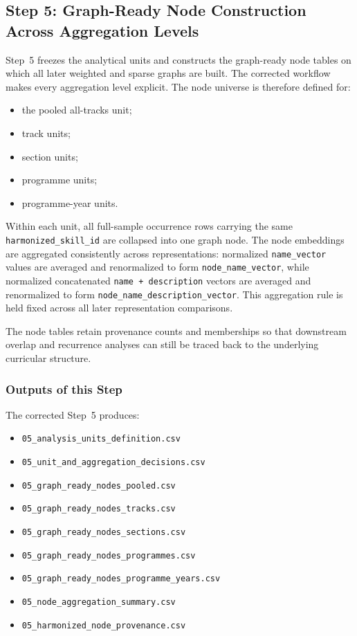 \subsection{Step 5: Graph-Ready Node Construction Across Aggregation Levels}
\label{sec:step5_graph_ready_nodes}

Step~5 freezes the analytical units and constructs the graph-ready node tables on which all later weighted and sparse graphs are built. The corrected workflow makes every aggregation level explicit. The node universe is therefore defined for:
\begin{itemize}
    \item the pooled all-tracks unit;
    \item track units;
    \item section units;
    \item programme units;
    \item programme-year units.
\end{itemize}

Within each unit, all full-sample occurrence rows carrying the same \texttt{harmonized\_skill\_id} are collapsed into one graph node. The node embeddings are aggregated consistently across representations: normalized \texttt{name\_vector} values are averaged and renormalized to form \texttt{node\_name\_vector}, while normalized concatenated \texttt{name + description} vectors are averaged and renormalized to form \texttt{node\_name\_description\_vector}. This aggregation rule is held fixed across all later representation comparisons.

The node tables retain provenance counts and memberships so that downstream overlap and recurrence analyses can still be traced back to the underlying curricular structure.

\subsubsection{Outputs of this Step}
\label{sec:step5_outputs}

The corrected Step~5 produces:
\begin{itemize}
    \item \texttt{05\_analysis\_units\_definition.csv}
    \item \texttt{05\_unit\_and\_aggregation\_decisions.csv}
    \item \texttt{05\_graph\_ready\_nodes\_pooled.csv}
    \item \texttt{05\_graph\_ready\_nodes\_tracks.csv}
    \item \texttt{05\_graph\_ready\_nodes\_sections.csv}
    \item \texttt{05\_graph\_ready\_nodes\_programmes.csv}
    \item \texttt{05\_graph\_ready\_nodes\_programme\_years.csv}
    \item \texttt{05\_node\_aggregation\_summary.csv}
    \item \texttt{05\_harmonized\_node\_provenance.csv}
\end{itemize}

